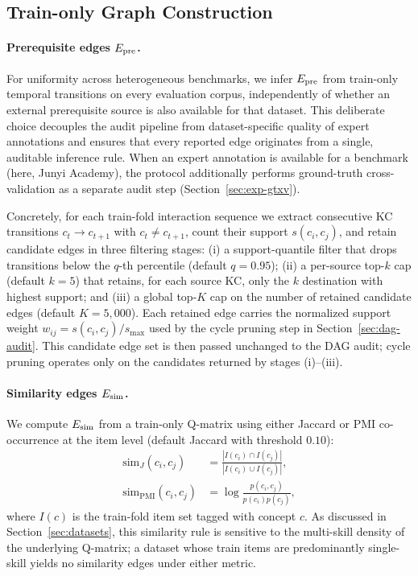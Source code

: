 \subsection{Train-only Graph Construction}
\label{sec:graph}
\paragraph{Prerequisite edges $E_{\text{pre}}$.}
For uniformity across heterogeneous benchmarks, we infer $E_{\text{pre}}$ from
train-only temporal transitions on every evaluation corpus,
independently of whether an external prerequisite source is also
available for that dataset. This deliberate choice decouples the audit
pipeline from dataset-specific quality of expert annotations and
ensures that every reported edge originates from a single, auditable
inference rule. When an expert annotation is available for a benchmark
(here, Junyi Academy), the protocol additionally performs ground-truth
cross-validation as a separate audit step (Section~\ref{sec:exp-gtxv}).

Concretely, for each train-fold interaction sequence we extract
consecutive KC transitions $c_{t} \rightarrow c_{t+1}$ with
$c_{t} \neq c_{t+1}$, count their support $s(c_i, c_j)$, and retain
candidate edges in three filtering stages:
(i) a support-quantile filter that drops transitions below the
$q$-th percentile (default $q = 0.95$);
(ii) a per-source top-$k$ cap (default $k = 5$) that retains, for each
source KC, only the $k$ destination \KCs{} with highest support; and
(iii) a global top-$K$ cap on the number of retained candidate edges
(default $K = 5{,}000$). Each retained edge carries the normalized
support weight $w_{ij} = s(c_i, c_j) / s_{\max}$ used by the cycle
pruning step in Section~\ref{sec:dag-audit}. This candidate edge set
is then passed unchanged to the DAG audit; cycle pruning operates only
on the candidates returned by stages (i)--(iii).
\paragraph{Similarity edges $E_{\text{sim}}$.}
We compute $E_{\text{sim}}$ from a train-only Q-matrix using either Jaccard or
PMI co-occurrence at the item level (default Jaccard with threshold
$0.10$):
\begin{align}
\mathrm{sim}_J(c_i,c_j) &=
\frac{|I(c_i)\cap I(c_j)|}{|I(c_i)\cup I(c_j)|},\\
\mathrm{sim}_{\mathrm{PMI}}(c_i,c_j) &=
\log \frac{p(c_i,c_j)}{p(c_i)p(c_j)},
\end{align}
where $I(c)$ is the train-fold item set tagged with concept $c$. As
discussed in Section~\ref{sec:datasets}, this similarity rule is
sensitive to the multi-skill density of the underlying Q-matrix; a
dataset whose train items are predominantly single-skill yields no
similarity edges under either metric.

